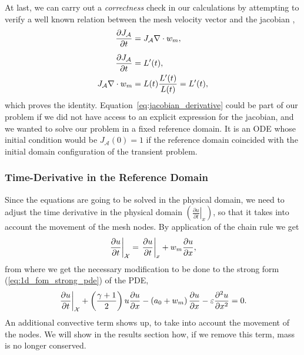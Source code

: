 \documentclass[../../thesis.tex]{subfiles}
\newcommand{\alemap}{\ensuremath{\mathcal{A}}}
\newcommand{\aleX}{\ensuremath{\mathcal{X}}}
\begin{document}
At last, we can carry out a \textit{correctness} check in our calculations by attempting to verify a well known relation between the mesh velocity vector and the jacobian \cite{aris1990vectors},
\begin{subequations}
    \begin{align}
        \pdv{J_{\alemap}}{t} &= J_{\alemap} \nabla \cdot w_m,
        \label{eq:jacobian_derivative}
        \\[2mm]
        \pdv{J_{\alemap}}{t} &= L'(t),
        \\
        J_{\alemap} \nabla \cdot w_m 
        &= L(t) \frac{L'(t)}{L(t)} 
        = L'(t),
    \end{align}
\end{subequations}
which proves the identity.
Equation~\eqref{eq:jacobian_derivative} could be part of our problem 
if we did not have access to an explicit expression for the jacobian, 
and we wanted to solve our problem in a fixed reference domain. 
It is an ODE whose initial condition would be 
$J_{\alemap}(0) = 1$
if the reference domain coincided with the initial domain configuration of the transient problem.


\subsubsection*{Time-Derivative in the Reference Domain}
Since the equations are going to be solved in the physical domain, we need to adjust the time derivative in the physical domain 
$\left(\left.\frac{\partial u}{\partial t}\right|_{x}\right)$, 
so that it takes into account the movement of the mesh nodes.
By application of the chain rule we get
\begin{equation}
    \left.\frac{\partial u}{\partial t}\right|_{\aleX} = 
    \left.\frac{\partial u}{\partial t}\right|_{x} + w_m \pdv{u}{x},
\end{equation}
from where we get the necessary modification to be done to the strong form (\ref{eq:1d_fom_strong_pde}) of the PDE, 
\begin{equation}
    \left.\frac{\partial u}{\partial t}\right|_{\aleX} 
    + \left(\frac{\gamma+1}{2}\right) u \frac{\partial u}{\partial x} 
    - \left(a_0 + w_m\right)\frac{\partial u}{\partial x} 
    - \varepsilon \pdv[2]{u}{x} = 0.
\end{equation}
An additional convective term shows up, to take into account the movement of the nodes.
We will show in the results section how, if we remove this term, mass is no longer conserved.
\end{document}

